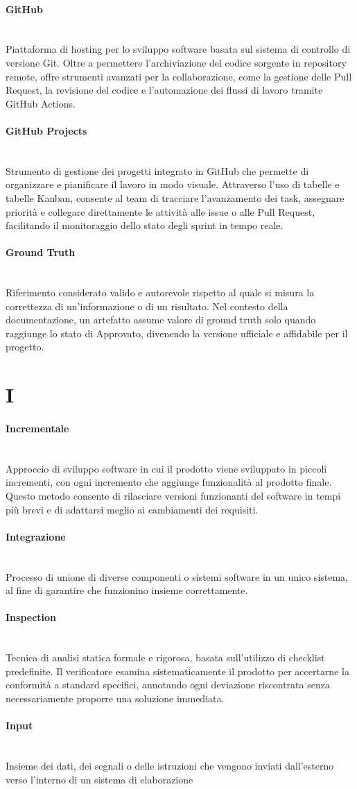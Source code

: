 \documentclass[a4paper, 10pt, colorlinks=true, linkcolor=black, urlcolor=blue, citecolor=blue, hidelinks]{article}
\newcommand{\glossaryterm}[2]{
    \paragraph{#1 \label{term:#1}} \mbox{} \\
    #2
    \vspace{0.5em}
}
\begin{document}
\glossaryterm{GitHub}{Piattaforma di hosting per lo sviluppo software basata sul sistema di controllo di versione Git. Oltre a permettere l'archiviazione del codice sorgente in repository remote, offre strumenti avanzati per la collaborazione, come la gestione delle Pull Request, la revisione del codice e l'automazione dei flussi di lavoro tramite GitHub Actions.}

\glossaryterm{GitHub Projects}{Strumento di gestione dei progetti integrato in GitHub che permette di organizzare e pianificare il lavoro in modo visuale. Attraverso l'uso di tabelle e tabelle Kanban, consente al team di tracciare l'avanzamento dei task, assegnare priorità e collegare direttamente le attività alle issue o alle Pull Request, facilitando il monitoraggio dello stato degli sprint in tempo reale.}

\glossaryterm{Ground Truth}{Riferimento considerato valido e autorevole rispetto al quale si misura la correttezza di un'informazione o di un risultato. Nel contesto della documentazione, un artefatto assume valore di ground truth solo quando raggiunge lo stato di Approvato, divenendo la versione ufficiale e affidabile per il progetto.}

\newpage

\section*{I}

\glossaryterm{Incrementale}{Approccio di sviluppo software in cui il prodotto viene sviluppato in piccoli incrementi, con ogni incremento che aggiunge funzionalità al prodotto finale. Questo metodo consente di rilasciare versioni funzionanti del software in tempi più brevi e di adattarsi meglio ai cambiamenti dei requisiti.}

\glossaryterm{Integrazione}{Processo di unione di diverse componenti o sistemi software in un unico sistema, al fine di garantire che funzionino insieme correttamente.}

\glossaryterm{Inspection}{Tecnica di analisi statica formale e rigorosa, basata sull'utilizzo di checklist predefinite. Il verificatore esamina sistematicamente il prodotto per accertarne la conformità a standard specifici, annotando ogni deviazione riscontrata senza necessariamente proporre una soluzione immediata.}

\glossaryterm{Input}{Insieme dei dati, dei segnali o delle istruzioni che vengono inviati dall'esterno verso l'interno di un sistema di elaborazione}
\end{document}
